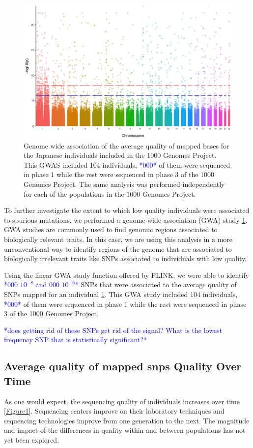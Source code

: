 \documentclass[]{elife}
\newcommand{\todo}[1]{\textcolor{blue}{*#1*}}
\begin{document}
\begin{figure}
\includegraphics[width=\hsize,keepaspectratio]{GWAS_Qual_GenomeWide_JPT.jpg}
\caption{Genome wide association of the average quality of mapped bases for the Japanese individuals included in the 1000 Genomes Project. This GWAS included 104 individuals, \todo{000} of them were sequenced in phase 1 while the rest were sequenced in phase 3 of the 1000 Genomes Project. The same analysis was performed independently for each of the populations in the 1000 Genomes Project. }
 \label{Figure2}
\end{figure}

To further investigate	 the extent to which low quality individuals were associated to spurious mutations, we performed a genome-wide association (GWA) study  \ref{Figure2}. GWA studies are commonly used to find genomic regions associated to biologically relevant traits. In this case, we are using this analysis in a more unconventional way to identify regions of the genome that are associated to biologically irrelevant traits like SNPs associated to individuals with low quality.
 
Using the linear GWA study function offered by PLINK, we were able to identify \todo{000 $10^{-8}$ and 000 $10^{-6}$} SNPs that were associated to the average quality of SNPs mapped for an individual \ref{Figure2}.  This GWA study included 104 individuals, \todo{000} of them were sequenced in phase 1 while the rest were sequenced in phase 3 of the 1000 Genomes Project.

\todo{does getting rid of these SNPs get rid of the signal? What is the lowest frequency SNP that is statistically significant?}

	\subsection{Average quality of mapped snps Quality Over Time}
As one would expect, the sequencing quality of individuals increases over time \ref{Figure1}. Sequencing centers improve on their laboratory techniques and sequencing technologies improve from one generation to the next. The magnitude and impact of the differences in quality within and between populations has not yet been explored. 
\end{document}
